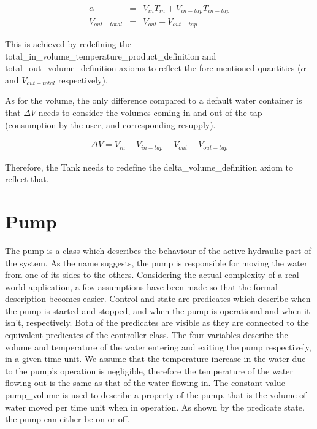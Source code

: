\documentclass[a4paper,12pt]{article}
\begin{document}
\begin{eqnarray*}
\alpha &=& V_{in}T_{in} + V_{in-tap} T_{in-tap}\\
 V_{out-total} &=& V_{out} + V_{out-tap}
\end{eqnarray*}

This is achieved by redefining the total\_in\_volume\_temperature\_product\_definition and total\_out\_volume\_definition axioms to reflect the fore-mentioned quantities ($\alpha$ and $V_{out-total}$ respectively).

As for the volume, the only difference compared to a default water container is that $\Delta V$ needs to consider the volumes coming in and out of the tap (consumption by the user, and corresponding resupply). 

\begin{eqnarray*}
\Delta V =  V_{in} + V_{in-tap} - V_{out} - V_{out-tap}
\end{eqnarray*}

Therefore, the Tank needs to redefine the delta\_volume\_definition axiom to reflect that.

\pagebreak
\begin{adjustwidth}{-4em}{-4em}
\end{adjustwidth}
\pagebreak

\section{Pump}

The pump is a class which describes the behaviour of the active hydraulic part of the system. As the name suggests, the pump is responsible for moving the water from one of its sides to the others. Considering the actual complexity of a real-world application, a few assumptions have been made so that the formal description becomes easier. Control and state are predicates which describe when the pump is started and stopped, and when the pump is operational and when it isn't, respectively. Both of the predicates are visible as they are connected to the equivalent predicates of the controller class. The four variables describe the volume and temperature of the water entering and exiting the pump respectively, in a given time unit. We assume that the temperature increase in the water due to the pump's operation is negligible, therefore the temperature of the water flowing out is the same as that of the water flowing in. The constant value pump\_volume is used to describe a property of the pump, that is the volume of water moved per time unit when in operation. As shown by the predicate state, the pump can either be on or off.
\end{document}
